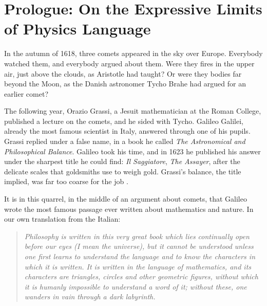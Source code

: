 \chapter[Prologue: Limits of Physics Language]{Prologue: On the Expressive Limits of Physics Language}\label{ch:prologue}



In the autumn of 1618, three comets appeared in the sky over Europe. Everybody watched them, and everybody argued about them. Were they fires in the upper air, just above the clouds, as Aristotle had taught? Or were they bodies far beyond the Moon, as the Danish astronomer Tycho Brahe had argued for an earlier comet?

The following year, Orazio Grassi, a Jesuit mathematician at the Roman College, published a lecture on the comets, and he sided with Tycho. Galileo Galilei, already the most famous scientist in Italy, answered through one of his pupils. Grassi replied under a false name, in a book he called \emph{The Astronomical and Philosophical Balance}. Galileo took his time, and in 1623 he published his answer under the sharpest title he could find: \emph{Il Saggiatore}, \emph{The Assayer}, after the delicate scales that goldsmiths use to weigh gold. Grassi's balance, the title implied, was far too coarse for the job \citep{Galileo1623,Drake1957}.

It is in this quarrel, in the middle of an argument about comets, that Galileo wrote the most famous passage ever written about mathematics and nature. In our own translation from the Italian:

\begin{quote}
\itshape Philosophy is written in this very great book which lies continually open before our eyes (I mean the universe), but it cannot be understood unless one first learns to understand the language and to know the characters in which it is written. It is written in the language of mathematics, and its characters are triangles, circles and other geometric figures, without which it is humanly impossible to understand a word of it; without these, one wanders in vain through a dark labyrinth.
\end{quote}

